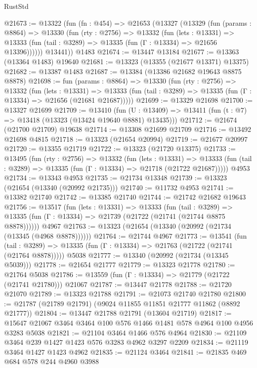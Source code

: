 \begin{lexlean}{RustStd}
\begin{coremodule}
@21673 := @13322
    (fun (fn : @454) =>
    @21653
      (@13327
        (@13329
          (fun (params : @8864) =>
          @13330
            (fun (rty : @2756) =>
            @13332
              (fun (lets : @13331) =>
              @13333 (fun (tail : @3289) => @13335 (fun (Γ : @13334) => @21656 @13396))))))
        @13441))
    @1483
@21674 := @13447 @13184
@21677 := @13363 (@13364 @1483) @19640
@21681 := @13323 (@13355 (@21677 @13371) @13375)
@21682 := @13387 @1483
@21687 := @13384 (@13386 @21682 @19643 @8875 @8878)
@21698 := fun (params : @8864) =>
  @13330
    (fun (rty : @2756) =>
    @13332
      (fun (lets : @13331) =>
      @13333 (fun (tail : @3289) => @13335 (fun (Γ : @13334) => @21656 (@21681 @21687)))))
@21699 := @13329 @21698
@21700 := @13327 @21699
@21709 := @13410
    (fun (U : @13409) => @13411 (fun (t : @7) => @13418 (@13323 (@13424 @19640 @8881) @13435)))
@21712 := @21674 (@21700 @21709) @19638
@21714 := @13308 @21699 @21709
@21716 := @13492 @21698 @4815
@21718 := @13323 (@21654 @20994)
@21719 := @21677 @20997
@21720 := @13355 @21719
@21722 := @13323 (@21720 @13375)
@21733 := @13495
    (fun (rty : @2756) =>
    @13332
      (fun (lets : @13331) =>
      @13333 (fun (tail : @3289) => @13335 (fun (Γ : @13334) => @21718 (@21722 @21687)))))
    @4953
@21734 := @13343 @4953
@21735 := @21734 @13348
@21739 := @13323 (@21654 (@13340 (@20992 @21735)))
@21740 := @11732 @4953
@21741 := @13382 @21740
@21742 := @13385 @21740
@21744 := @21742 @21682 @19643
@21756 := @13517
    (fun (lets : @13331) =>
    @13333
      (fun (tail : @3289) =>
      @13335 (fun (Γ : @13334) => @21739 (@21722 (@21741 (@21744 @8875 @8878))))))
    @4967
@21763 := @13323 (@21654 (@13340 (@20992 (@21734 (@13345 (@4968 @8878))))))
@21764 := @21744 @4967
@21773 := @13541
    (fun (tail : @3289) => @13335 (fun (Γ : @13334) => @21763 (@21722 (@21741 (@21764 @8878)))))
    @5038
@21777 := @13340 (@20992 (@21734 (@13345 @5039)))
@21778 := @21654 @21777
@21779 := @13323 @21778
@21780 := @21764 @5038
@21786 := @13559 (fun (Γ : @13334) => @21779 (@21722 (@21741 @21780))) @21067
@21787 := @13447 @21778
@21788 := @21720 @21070
@21789 := @13323 @21788
@21791 := @21073 @21740 @21780
@21800 := @21787 (@21789 @21791) (@9024 @11855 @11851 @21777 @11862 (@8892 @21777))
@21804 := @13447 @21788 @21791 (@13604 @21719)
@21817 := @15647 @21067 @3464 @3464 @100 @576 @1466 @1481 @578 @4964 @100 @4956 @3283 @5038
@21821 := @21104 @3464 @1466 @576 @4964
@21830 := @21109 @3464 @239 @1427 @1423 @576 @3283 @4962 @3297 @2209
@21834 := @21119 @3464 @1427 @1423 @4962
@21835 := @21124 @3464
@21841 := @21835 @469 @684 @578 @244 @4960 @3988

\end{coremodule}
\end{lexlean}
